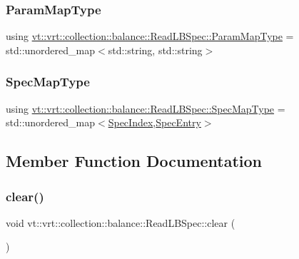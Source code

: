 \subsubsection{\texorpdfstring{Param\+Map\+Type}{ParamMapType}}
{\footnotesize\ttfamily using \hyperlink{structvt_1_1vrt_1_1collection_1_1balance_1_1_read_l_b_spec_a01c2aa3a9e92be646c37f24afda6afa2}{vt\+::vrt\+::collection\+::balance\+::\+Read\+L\+B\+Spec\+::\+Param\+Map\+Type} =  std\+::unordered\+\_\+map$<$std\+::string, std\+::string$>$}

\mbox{\label{structvt_1_1vrt_1_1collection_1_1balance_1_1_read_l_b_spec_a6b1c83bd61c581d9605941e2381432b9}} 
\subsubsection{\texorpdfstring{Spec\+Map\+Type}{SpecMapType}}
{\footnotesize\ttfamily using \hyperlink{structvt_1_1vrt_1_1collection_1_1balance_1_1_read_l_b_spec_a6b1c83bd61c581d9605941e2381432b9}{vt\+::vrt\+::collection\+::balance\+::\+Read\+L\+B\+Spec\+::\+Spec\+Map\+Type} =  std\+::unordered\+\_\+map$<$\hyperlink{namespacevt_1_1vrt_1_1collection_1_1balance_a72a5e0d9936ddf57f8e6c64e0e9fd123}{Spec\+Index},\hyperlink{structvt_1_1vrt_1_1collection_1_1balance_1_1_spec_entry}{Spec\+Entry}$>$}



\subsection{Member Function Documentation}
\mbox{\label{structvt_1_1vrt_1_1collection_1_1balance_1_1_read_l_b_spec_aa92db6434f6eb0839312f914139d296c}} 
\subsubsection{\texorpdfstring{clear()}{clear()}}
{\footnotesize\ttfamily void vt\+::vrt\+::collection\+::balance\+::\+Read\+L\+B\+Spec\+::clear (\begin{DoxyParamCaption}{ }\end{DoxyParamCaption})\hspace{0.3cm}{\ttfamily [static]}}


